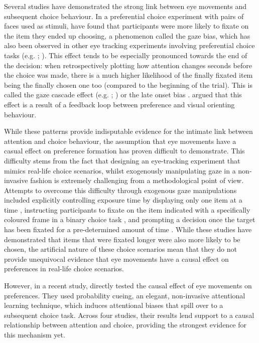 \documentclass[11pt,a4paper]{article}
\begin{document}
 Several studies have demonstrated the strong link between eye movements and subsequent choice behaviour. In a preferential choice experiment with pairs of faces used as stimuli,  have found that participants were more likely to fixate on the item they ended up choosing, a phenomenon called the gaze bias, which has also been observed in other eye tracking experiments involving preferential choice tasks (e.g. ; ). This effect tends to be especially pronounced towards the end of the decision: when retrospectively plotting how attention changes seconds before the choice was made, there is a much higher likelihood of the finally fixated item being the finally chosen one too (compared to the beginning of the trial). This is called the gaze cascade effect (e.g. ; ) or the late onset bias \cite{Mullett2016}.  argued that this effect is a result of a feedback loop between preference and visual orienting behaviour. 

While these patterns provide indisputable evidence for the intimate link between attention and choice behaviour, the assumption that eye movements have a casual effect on preference formation has proven difficult to demonstrate. This difficulty stems from the fact that designing an eye-tracking experiment that mimics real-life choice scenarios, whilst exogenously manipulating gaze in a non-invasive fashion is extremely challenging from a methodological point of view. Attempts to overcome this difficulty through exogenous gaze manipulations included explicitly controlling exposure time by displaying only one item at a time \cite{Armel2008}, instructing participants to fixate on the item indicated with a specifically coloured frame in a binary choice task \cite{Lim2011}, and prompting a decision once the target has been fixated for a pre-determined amount of time \cite{Parnamets2015}. While these studies have demonstrated that items that were fixated longer were also more likely to be chosen, the artificial nature of these choice scenarios mean that they do not provide unequivocal evidence that eye movements have a causal effect on preferences in real-life choice scenarios. 

However, in a recent study,  directly tested the causal effect of eye movements on preferences. They used probability cueing, an elegant, non-invasive attentional learning technique, which induces attentional biases that spill over to a subsequent choice task. Across four studies, their results lend support to a causal relationship between attention and choice, providing the strongest evidence for this mechanism yet.
\end{document}
